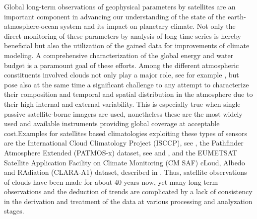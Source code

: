 \documentclass[amt]{style/copernicus}
\begin{document}
Global long-term observations of geophysical parameters by satellites are an important component in advancing our understanding of the state of the earth-atmosphere-ocean system and its impact on planetary climate. Not only the direct monitoring of these parameters by analysis of long time series is hereby beneficial but also the utilization of the gained data for improvements of climate modeling. A comprehensive characterization of the global energy and water budget is a paramount goal of these efforts. Among the different atmospheric constituents involved clouds not only play a major role, see for example \citet{Kiehl97}, but pose also at the same time a significant challenge to any attempt to characterize their composition and temporal and spatial distribution in the atmosphere due to their high internal and external variability. This is especially true when single passive satellite-borne imagers are used, nonetheless these are the most widely used and available instruments providing global coverage at acceptable cost.Examples for satellites based climatologies exploiting these types of sensors are the International Cloud Climatology Project (ISCCP), see \citet{Rossow99}, the Pathfinder Atmosphere Extended (PATMOS-x) dataset, see \citet{Heidinger09} and \citet{Heidinger12}, and the EUMETSAT Satellite Application Facility on Climate Monitoring (CM SAF) cLoud, Albedo and RAdiation (CLARA-A1) dataset, described in \citet{Karlsson13}. Thus, satellite observations of clouds have been made for about 40 years now, yet many long-term observations and the deduction of trends are complicated by a lack of consistency in the derivation and treatment of the data at various processing and analyzation stages.
\end{document}
